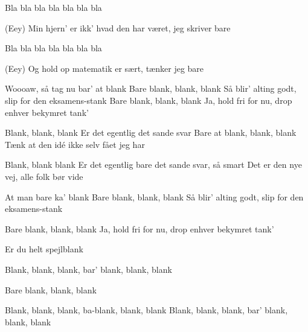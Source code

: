 \documentclass[a4paper,11pt]{article}
\begin{document}
\begin{song}
%  
Bla bla bla bla bla bla bla

%  
(Eey) Min hjern' er ikk' hvad den har været, jeg skriver bare

%  
Bla bla bla bla bla bla bla

%  
(Eey) Og hold op matematik er sært, tænker jeg bare

%
Woooaw, så tag nu bar' at blank
Bare blank, blank, blank
Så blir' alting godt, slip for den eksamens-stank
Bare blank, blank, blank
Ja, hold fri for nu, drop enhver bekymret tank'

%
Blank, blank, blank
Er det egentlig det sande svar
Bare at blank, blank, blank
Tænk at den idé ikke selv fået jeg har

%
Blank, blank blank
Er det egentlig bare det sande svar, så smart
Det er den nye vej, alle folk bør vide

%
At man bare ka' blank
Bare blank, blank, blank
Så blir' alting godt, slip for den eksamens-stank


%
Bare blank, blank, blank
Ja, hold fri for nu, drop enhver bekymret tank'

%
Er du helt spejlblank

%
Blank, blank, blank, bar' blank, blank, blank

%
Bare blank, blank, blank

%
Blank, blank, blank, ba-blank, blank, blank
Blank, blank, blank, bar' blank, blank, blank



\end{song}
\end{document}
